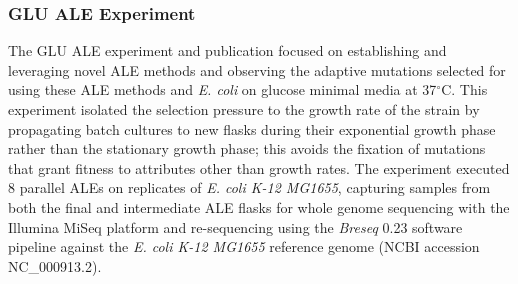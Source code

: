 \documentclass[12pt,final,masters,chapterheads]{ucsd}  %
\begin{document}
\subsubsection{GLU ALE Experiment}
%
%
The GLU ALE experiment and publication focused on establishing and leveraging novel ALE methods and observing the adaptive mutations selected for using these ALE methods and \textit{E. coli} on glucose minimal media at 37$^{\circ}$C. This experiment isolated the selection pressure to the growth rate of the strain by propagating batch cultures to new flasks during their exponential growth phase rather than the stationary growth phase; this avoids the fixation of mutations that grant fitness to attributes other than growth rates. The experiment executed 8 parallel ALEs on replicates of \textit{E. coli K-12 MG1655}, capturing samples from both the final and intermediate ALE flasks for whole genome sequencing with the Illumina MiSeq platform and re-sequencing using the \textit{Breseq} 0.23 software pipeline against the \textit{E. coli K-12 MG1655} reference genome (NCBI accession NC\_000913.2).
\end{document}

